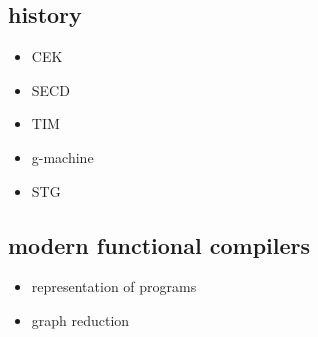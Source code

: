
\subsection{history}
\begin{itemize}
    \item CEK
    \item SECD
    \item TIM
    \item g-machine
    \item STG
\end{itemize}
\subsection{modern functional compilers}
\begin{itemize}
    \item representation of programs
    \item graph reduction
\end{itemize}
